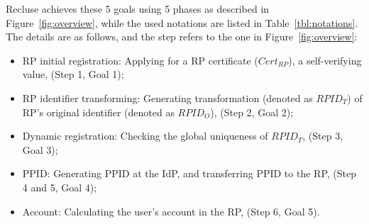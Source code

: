 
Recluse achieves these 5 goals using 5 phases as described in Figure~\ref{fig:overview}, while the used notations are listed in Table~\ref{tbl:notations}. The details are as follows, and the step refers to the one in Figure~\ref{fig:overview}:
\begin{itemize}
  \item RP initial registration: Applying for a RP certificate ($Cert_{RP}$), a self-verifying value,  (Step 1, Goal 1);
  \item RP identifier transforming: Generating transformation (denoted as $RPID_T$) of RP's original identifier (denoted as $RPID_O$), (Step 2, Goal 2);
  \item Dynamic registration: Checking the global uniqueness of $RPID_T$, (Step 3, Goal 3);
  \item PPID:  Generating PPID at the IdP, and transferring PPID to the RP, (Step 4 and 5, Goal 4);
  \item Account: Calculating the user's account in the RP, (Step 6, Goal 5).
\end{itemize}

